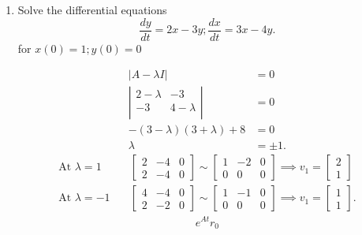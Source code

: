 \documentclass{zc-ust-hw}
\begin{document}
\begin{enumerate}
\begin{enumerate}
     \item Solve the differential equations
       \[
         \frac{dy}{dt} = 2x-3y; \frac{dx}{dt} = 3x-4y
       .\]
       for \( x(0)=1;y(0)=0 \)
       \begin{sol}
         \begin{align}
           |A-\lambda I| &= 0 \\
           \left|\begin{array}{ccc}
             2-\lambda & -3 \\ -3 & 4-\lambda \\
           \end{array}\right| &= 0 \\
           -(3-\lambda)(3+\lambda)+8 &= 0 \\
           \lambda &= \pm 1
         .\end{align}
         \begin{align}
          \text{At \(\lambda = 1\)}
          &\quad
          \left[\begin{array}{cc|c}
              2&-4&0\\
              2&-4&0
          \end{array}\right]
          \sim
          \left[\begin{array}{cc|c}
              1&-2&0\\
              0&0&0
          \end{array}\right]
          \implies
          v_{1} = \begin{bmatrix} 2\\1 \end{bmatrix} \\
          \text{At \(\lambda = -1\)}
          &\quad
          \left[\begin{array}{cc|c}
              4&-4&0\\
              2&-2&0
          \end{array}\right]
          \sim
          \left[\begin{array}{cc|c}
              1&-1&0\\
              0&0&0
          \end{array}\right]
          \implies
          v_{1} = \begin{bmatrix} 1\\1 \end{bmatrix}
        .\end{align}
        \begin{gather}
          e^{At}r_{0} \\ 

\end{gather}
\end{sol}
\end{enumerate}
\end{enumerate}
\end{document}
